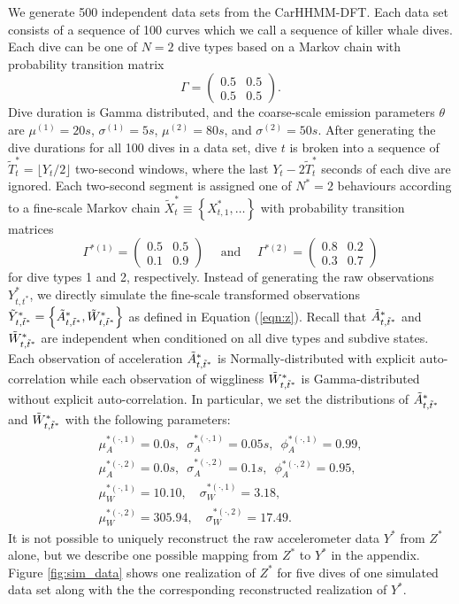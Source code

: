 We generate 500 independent data sets from the CarHHMM-DFT. Each data set consists of a sequence of 100 curves which we call a sequence of killer whale dives. Each dive can be one of $N=2$ dive types based on a Markov chain with probability transition matrix
%
$$\Gamma = \begin{pmatrix} 0.5 & 0.5 \\ 0.5 & 0.5 \end{pmatrix}.$$
%
Dive duration is Gamma distributed, and the coarse-scale emission parameters $\theta$ are $\mu^{(1)} = 20s$, $\sigma^{(1)} = 5s$, $\mu^{(2)} = 80s$, and $\sigma^{(2)} = 50s$. After generating the dive durations for all 100 dives in a data set, dive $t$ is broken into a sequence of $\tilde T^*_t = \lfloor Y_t/2 \rfloor$ two-second windows, where the last $Y_t - 2 \tilde T^*_t$ seconds of each dive are ignored. Each two-second segment is assigned one of $N^*=2$ behaviours according to a fine-scale Markov chain $\tilde X^*_t \equiv \left\{X^*_{t,1}, \ldots \right\}$ with probability transition matrices
%
$$\Gamma^{*(1)} = \begin{pmatrix} 0.5 & 0.5 \\ 0.1 & 0.9 \end{pmatrix} \quad \text{ and } \quad \Gamma^{*(2)} = \begin{pmatrix} 0.8 & 0.2 \\ 0.3 & 0.7 \end{pmatrix}$$ 
%
for dive types 1 and 2, respectively.
Instead of generating the raw observations $Y^*_{t,t^*}$, we directly simulate the fine-scale transformed observations $\tilde{Y}^*_{t,\tilde t^*} = \left\{\tilde{A}^*_{t,\tilde t^*}, \tilde{W}^*_{t,\tilde t^*}\right\}$ as defined in Equation (\ref{eqn:z}). Recall that $\tilde{A}^*_{t,\tilde t^*}$ and $\tilde{W}^*_{t,\tilde t^*}$ are independent when conditioned on all dive types and subdive states. Each observation of acceleration $\tilde{A}^*_{t,\tilde t^*}$ is Normally-distributed with explicit auto-correlation while each observation of wiggliness $\tilde{W}^*_{t,\tilde t^*}$ is Gamma-distributed without explicit auto-correlation. In particular, we set the distributions of $\tilde{A}^*_{t,\tilde t^*}$ and $\tilde{W}^*_{t,\tilde t^*}$ with the following parameters:
%
\begin{gather*}
    \mu_A^{*(\cdot,1)} = 0.0 s, \enspace \sigma_A^{*(\cdot,1)} = 0.05s, \enspace \phi_A^{*(\cdot,1)} = 0.99, \\
    \mu_A^{*(\cdot,2)} = 0.0 s, \enspace \sigma_A^{*(\cdot,2)} = 0.1s, \enspace \phi_A^{*(\cdot,2)} = 0.95, \\
    \mu_W^{*(\cdot,1)} = 10.10, \quad \sigma_W^{*(\cdot,1)} = 3.18, \\
    \mu_W^{*(\cdot,2)} = 305.94, \quad \sigma_W^{*(\cdot,2)} = 17.49.
\end{gather*}
%
It is not possible to uniquely reconstruct the raw accelerometer data $Y^*$ from $Z^*$ alone, but we describe one possible mapping from $Z^*$ to $Y^*$ in the appendix. Figure \ref{fig:sim_data} shows one realization of $Z^*$ for five dives of one simulated data set along with the the corresponding reconstructed realization of $Y^*$. 

